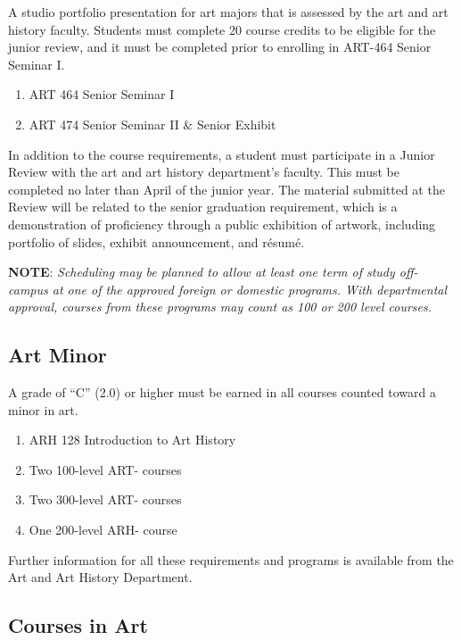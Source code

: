 \documentclass[
  letterpaper,
]{scrbook}
\providecommand{\tightlist}{%
  \setlength{\itemsep}{0pt}\setlength{\parskip}{0pt}}
\begin{document}
A studio portfolio presentation for art majors that is assessed by the
art and art history faculty. Students must complete 20 course credits to
be eligible for the junior review, and it must be completed prior to
enrolling in ART-464 Senior Seminar I.

\begin{enumerate}
\def\labelenumi{\arabic{enumi}.}
\setcounter{enumi}{7}
\tightlist
\item
  ART 464 Senior Seminar I
\item
  ART 474 Senior Seminar II \& Senior Exhibit
\end{enumerate}

In addition to the course requirements, a student must participate in a
Junior Review with the art and art history department's faculty. This
must be completed no later than April of the junior year. The material
submitted at the Review will be related to the senior graduation
requirement, which is a demonstration of proficiency through a public
exhibition of artwork, including portfolio of slides, exhibit
announcement, and résumé.

\textbf{NOTE}: \emph{Scheduling may be planned to allow at least one
term of study off-campus at one of the approved foreign or domestic
programs. With departmental approval, courses from these programs may
count as 100 or 200 level courses.}

\subsection{Art Minor}\label{art-minor}

A grade of ``C'' (2.0) or higher must be earned in all courses counted
toward a minor in art.

\begin{enumerate}
\def\labelenumi{\arabic{enumi}.}
\tightlist
\item
  ARH 128 Introduction to Art History
\item
  Two 100-level ART- courses
\item
  Two 300-level ART- courses
\item
  One 200-level ARH- course
\end{enumerate}

Further information for all these requirements and programs is available
from the Art and Art History Department.

\subsection{Courses in Art}\label{courses-in-art}
\end{document}
